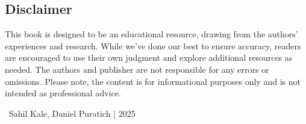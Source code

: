 \documentclass[main.tex]{subfiles}
\begin{document}
\subsection{Disclaimer}
This book is designed to be an educational resource, drawing from the authors' experiences and research. While we've done our best to ensure accuracy, readers are encouraged to use their own judgment and explore additional resources as needed. The authors and publisher are not responsible for any errors or omissions. Please note, the content is for informational purposes only and is not intended as professional advice. \newline

\newnoindentpara \textcopyright \ Sahil Kale, Daniel Puratich | 2025
\end{document}

